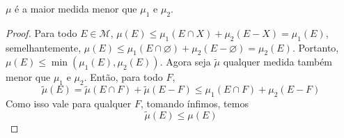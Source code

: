 \begin{prop}
    $\mu$ é a maior medida menor que $\mu_1$ e $\mu_2$.
\end{prop}
\begin{proof}
    Para todo $E \in \mathcal{M}$, $\mu(E) \leq \mu_1(E \cap X) + \mu_2(E - X) = \mu_1(E)$, 
    semelhantemente, $\mu(E) \leq \mu_1(E \cap \varnothing) + \mu_2(E - \varnothing) = \mu_2(E)$. Portanto,
    $\mu(E) \leq \min(\mu_1(E), \mu_2(E))$. Agora seja $\tilde{\mu}$ qualquer medida também menor que $\mu_1$ e $\mu_2$.
    Então, para todo $F$,
    $$\tilde{\mu}(E) = \tilde{\mu}(E\cap F) + \tilde{\mu}(E - F) \leq \mu_1(E \cap F) + \mu_2(E - F)$$
    Como isso vale para qualquer $F$, tomando ínfimos, temos
    $$\tilde{\mu}(E) \leq \mu(E)$$
\end{proof}

\begin{problem}
    \label{prob:l1:5}
\end{problem}


